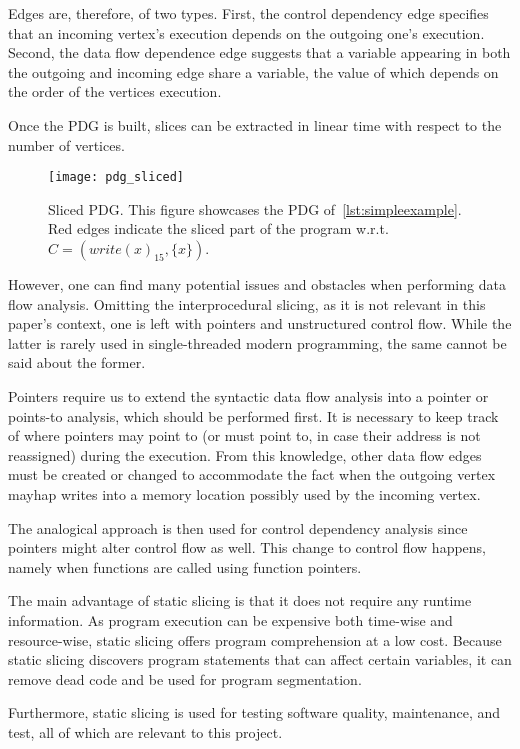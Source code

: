 Edges are, therefore, of two types. 
First, the control dependency edge specifies that an incoming vertex's 
execution depends on the outgoing one's execution. 
Second, the data flow dependence edge suggests that a variable appearing
in both the outgoing and incoming edge share a variable,
the value of which depends on the order of the vertices execution.

Once the PDG is built, slices can be extracted in linear time 
with respect to the number of vertices.

\begin{figure}[h]\centering
\texttt{[image: pdg\_sliced]}
\caption{Sliced PDG. This figure showcases 
the PDG of~\ref{lst:simpleexample}.
Red edges indicate the sliced part of the program w.r.t.
$C = (write(x)_{15}, \{x\})$.}
\label{img:pdg}
\end{figure}

However, one can find many potential issues and obstacles when performing 
data flow analysis. 
Omitting the interprocedural slicing, as it is not relevant in this paper's
context, one is left with pointers and unstructured control flow.
While the latter is rarely used in single-threaded modern programming, 
the same cannot be said about the former. 

Pointers require us to extend the syntactic data flow analysis 
into a pointer or points-to analysis, which should be performed first. 
It is necessary to keep track of where pointers may point to (or must point to,
in case their address is not reassigned) during the execution. 
From this knowledge, other data flow edges must be created or
changed to accommodate the fact when the outgoing vertex mayhap writes
into a memory location possibly used by the incoming vertex. 

The analogical approach is then used for control dependency analysis since 
pointers might alter control flow as well. 
This change to control flow happens, namely when functions are called using 
function pointers.

The main advantage of static slicing is that it does not require
any runtime information. 
As program execution can be expensive both time-wise and resource-wise, 
static slicing offers program comprehension at a low cost. 
Because static slicing discovers program statements that can affect 
certain variables, it can remove dead code and be used for program segmentation. 

Furthermore, static slicing is used for testing software quality, maintenance, 
and test, all of which are relevant to this project.

